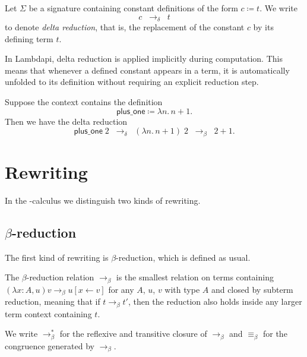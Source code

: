 \begin{definition}
Let $\Sigma$ be a signature containing constant definitions of the form 
$c \coloneqq t$. 
We write
\[
c \;\;\rightarrow_\delta\;\; t
\]
to denote \emph{delta reduction}\index{$\rightarrow_\delta$}, that is, the replacement of the constant 
$c$ by its defining term $t$.
\end{definition}

In Lambdapi, delta reduction is applied implicitly during computation.
This means that whenever a defined constant appears in a term, it is automatically unfolded to its definition without requiring an explicit reduction step.


\begin{example}
Suppose the context contains the definition
\[
\mathsf{plus\_one} \coloneqq \lambda n.\, n + 1.
\]
Then we have the delta reduction
\[
\mathsf{plus\_one}\;2 \;\;\rightarrow_\delta\;\; (\lambda n.\, n + 1)\;2
\;\;\rightarrow_\beta\;\; 2 + 1.
\]
\end{example}



\section{Rewriting}
\label{sect:lambdapi-rw}

In the \lpm-calculus we distinguish two kinds of rewriting.

\subsection{\texorpdfstring{$\beta$}{}-reduction}

The first kind of rewriting is $\beta$-reduction, which is defined as usual.

\begin{definition} The $\beta$-reduction relation $\longrightarrow_\beta$ is the smallest relation on terms containing
\( (\lambda x:A, u)v \longrightarrow_\beta u[x \leftarrow v] \) for any $A$, $u$, $v$ with type $A$ and closed by subterm reduction,
meaning that if $t \longrightarrow_\beta t'$, then the reduction also holds inside any larger term context containing $t$.
\end{definition}

\begin{notation}
We write $\longrightarrow^*_\beta$ \index{$\longrightarrow^*_\beta$} for the reflexive and transitive closure of $\longrightarrow_\beta$ and $\equiv_\beta$ for the congruence generated by $\longrightarrow_\beta$.
\end{notation}

